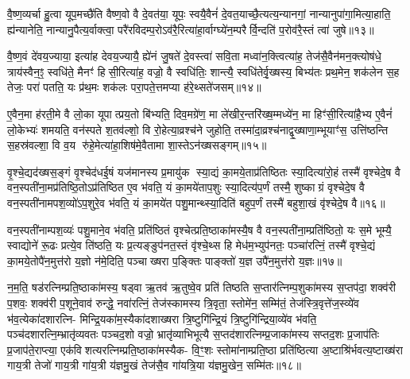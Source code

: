 {\anuvakamend[{अथ॑ ददते॒ स्वया॒ सन्थ्स्व॑धाका॒रो हि वि॑न्दति॥२॥}]}

वै॒ष्ण॒व्यर्चा हु॒त्वा यूप॒मच्छै॑ति वैष्ण॒वो वै दे॒वत॑या॒ यूपः॒ स्वयै॒वैनं॑ दे॒वत॒याच्छै॒त्यत्य॒न्यानगां॒ नान्यानुपा॑गा॒मित्या॒हाति॒ ह्य॑न्यानेति॒ नान्यानु॒पैत्य॒र्वाक्त्वा॒ परै॑रविदम्प॒रोऽव॑रै॒रित्या॑हा॒र्वाग्घ्ये॑न॒म्परैर्वि॒न्दति॑ प॒रोव॑रै॒स्तं त्वा॑ जुषे॥१३॥

वै॒ष्ण॒वं दे॑वय॒ज्याया॒ इत्या॑ह देवय॒ज्यायै॒ ह्ये॑नं जु॒षते॑ दे॒वस्त्वा॑ सवि॒ता मध्वा॑न॒क्त्वित्या॑ह॒ तेज॑सै॒वैन॑मन॒क्त्योष॑धे॒ त्राय॑स्वैन॒ꣵ॒ स्वधि॑ते॒ मैनꣳ॑ हिसी॒रित्या॑ह॒ वज्रो॒ वै स्वधि॑तिः॒ शान्त्यै॒ स्वधि॑तेर्वृ॒ख्षस्य॒ बिभ्य॑तः प्रथ॒मेन॒ शक॑लेन स॒ह तेजः॒ परा॑ पतति॒ यः प्र॑थ॒मः शक॑लः परा॒पते॒त्तमप्या ह॑रे॒थ्सते॑जसम्॥१४॥

ए॒वैन॒मा ह॑रती॒मे वै लो॒का यूपात्प्रय॒तो बि॑भ्यति॒ दिव॒मग्रे॑ण॒ मा ले॑खीर॒न्तरि॑ख्ष॒म्मध्ये॑न॒ मा हिꣳ॑सी॒रित्या॑है॒भ्य ए॒वैनं॑ लो॒केभ्यः॑ शमयति॒ वन॑स्पते श॒तव॑ल्\mbox{}शो॒ वि रो॒हेत्या॒व्रश्च॑ने जुहोति॒ तस्मा॑दा॒व्रश्च॑नाद्वृ॒ख्षाणा॒म्भूयाꣳ॑स॒ उत्ति॑ष्ठन्ति स॒हस्र॑वल्\mbox{}शा॒ वि व॒य रु॑हे॒मेत्या॑हा॒शिष॑मे॒वैतामा शा॒स्तेऽन॑ख्षसङ्गम्॥१५॥

वृ॒श्चे॒द्यद॑ख्षस॒ङ्गं वृ॒श्चेद॑धई॒षं यज॑मानस्य प्र॒मायु॑क स्या॒द्यं का॒मये॒ताप्र॑तिष्ठितः स्या॒दित्या॑रो॒हं तस्मै॑ वृश्चेदे॒ष वै वन॒स्पती॑ना॒मप्र॑तिष्ठि॒तोऽप्र॑तिष्ठित ए॒व भ॑वति॒ यं का॒मये॑ताप॒शुः स्या॒दित्य॑प॒र्णं तस्मै॒ शुष्काग्रं वृश्चेदे॒ष वै वन॒स्पती॑नामपश॒व्यो॑ऽप॒शुरे॒व भ॑वति॒ यं का॒मये॑त पशु॒मान्थ्स्या॒दिति॑ बहुप॒र्णं तस्मै॑ बहुशा॒खं वृ॑श्चेदे॒ष वै॥१६॥

वन॒स्पती॑नाम्पश॒व्यः॑ पशु॒माने॒व भ॑वति॒ प्रति॑ष्ठितं वृश्चेत्प्रति॒ष्ठाका॑मस्यै॒ष वै वन॒स्पती॑ना॒म्प्रति॑ष्ठितो॒ यः स॒मे भूम्यै॒ स्वाद्योने॑ रू॒ढः प्रत्ये॒व ति॑ष्ठति॒ यः प्र॒त्यङ्ङुप॑नत॒स्तं वृ॑श्चे॒थ्स हि मेध॑म॒भ्युप॑नतः॒ पञ्चा॑रत्निं॒ तस्मै॑ वृश्चे॒द्यं का॒मये॒तोपै॑न॒मुत्त॑रो य॒ज्ञो न॑मे॒दिति॒ पञ्चाख्षरा प॒ङ्क्तिः पाङ्क्तो॑ य॒ज्ञ उपै॑न॒मुत्त॑रो य॒ज्ञः॥१७॥

न॒म॒ति॒ षड॑रत्निम्प्रति॒ष्ठाका॑मस्य॒ षड्वा ऋ॒तव॑ ऋ॒तुष्वे॒व प्रति॑ तिष्ठति स॒प्तार॑त्निम्प॒शुका॑मस्य स॒प्तप॑दा॒ शक्व॑री प॒शवः॒ शक्व॑री प॒शूने॒वाव॑ रुन्द्धे॒ नवा॑रत्निं॒ तेज॑स्कामस्य त्रि॒वृता॒ स्तोमे॑न॒ सम्मि॑तं॒ तेज॑स्त्रि॒वृत्ते॑ज॒स्व्ये॑व भ॑व॒त्येका॑दशारत्नि- मिन्द्रि॒यका॑म॒स्यैका॑दशाख्षरा त्रि॒ष्टुगि॑न्द्रि॒यं त्रि॒ष्टुगि॑न्द्रिया॒व्ये॑व भ॑वति॒ पञ्च॑दशारत्नि॒म्भ्रातृ॑व्यवतः पञ्चद॒शो वज्रो॒ भ्रातृ॑व्याभिभूत्यै स॒प्तद॑शारत्निम्प्र॒जाका॑मस्य सप्तद॒शः प्र॒जाप॑तिः प्र॒जाप॑ते॒राप्त्या॒ एक॑विशत्यरत्निम्प्रति॒ष्ठाका॑मस्यैक- वि॒ꣳ॒शः स्तोमा॑नाम्प्रति॒ष्ठा प्रति॑ष्ठित्या अ॒ष्टाश्रि॑र्भवत्य॒ष्टाख्ष॑रा गाय॒त्री तेजो॑ गाय॒त्री गा॑य॒त्री य॑ज्ञमु॒खं तेज॑सै॒व गा॑यत्रि॒या य॑ज्ञमु॒खेन॒ सम्मि॑तः॥१८॥

